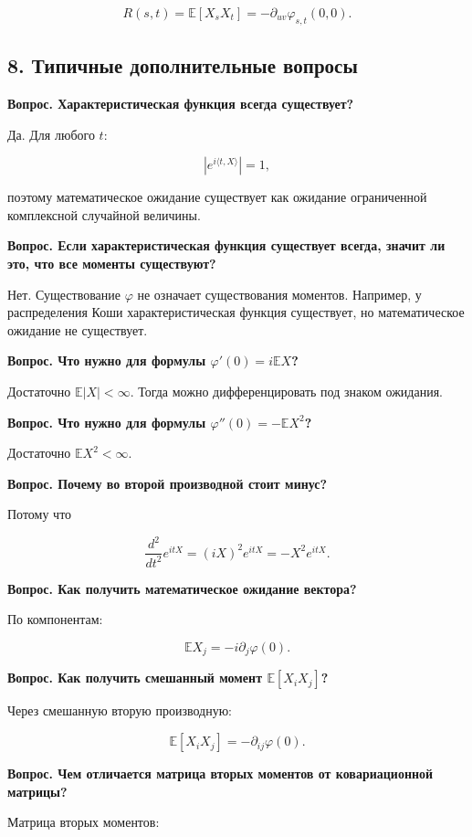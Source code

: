 \documentclass[
  11pt,
  a4paper,
]{article}
\begin{document}
\[
R(s,t)=\mathbb E[X_sX_t]
=
-\partial_{uv}\varphi_{s,t}(0,0).
\]

\subsection{8. Типичные дополнительные
вопросы}\label{ux442ux438ux43fux438ux447ux43dux44bux435-ux434ux43eux43fux43eux43bux43dux438ux442ux435ux43bux44cux43dux44bux435-ux432ux43eux43fux440ux43eux441ux44b}

\textbf{Вопрос. Характеристическая функция всегда существует?}

Да. Для любого \(t\):

\[
|e^{i\langle t,X\rangle}|=1,
\]

поэтому математическое ожидание существует как ожидание ограниченной
комплексной случайной величины.

\textbf{Вопрос. Если характеристическая функция существует всегда,
значит ли это, что все моменты существуют?}

Нет. Существование \(\varphi\) не означает существования моментов.
Например, у распределения Коши характеристическая функция существует, но
математическое ожидание не существует.

\textbf{Вопрос. Что нужно для формулы \(\varphi'(0)=i\mathbb EX\)?}

Достаточно \(\mathbb E|X|<\infty\). Тогда можно дифференцировать под
знаком ожидания.

\textbf{Вопрос. Что нужно для формулы \(\varphi''(0)=-\mathbb EX^2\)?}

Достаточно \(\mathbb EX^2<\infty\).

\textbf{Вопрос. Почему во второй производной стоит минус?}

Потому что

\[
\frac{d^2}{dt^2}e^{itX}
=(iX)^2e^{itX}
=-X^2e^{itX}.
\]

\textbf{Вопрос. Как получить математическое ожидание вектора?}

По компонентам:

\[
\mathbb EX_j=-i\partial_j\varphi(0).
\]

\textbf{Вопрос. Как получить смешанный момент \(\mathbb E[X_iX_j]\)?}

Через смешанную вторую производную:

\[
\mathbb E[X_iX_j]=-\partial_{ij}\varphi(0).
\]

\textbf{Вопрос. Чем отличается матрица вторых моментов от ковариационной
матрицы?}

Матрица вторых моментов:
\end{document}
